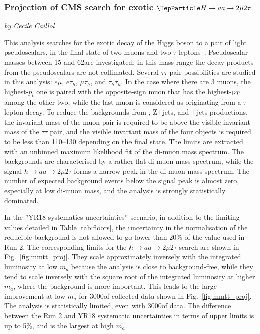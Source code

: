 \subsubsection{Projection of CMS search for exotic $\PH\to aa \to 2\mu 2\tau$}
\begin{center}
 {\it{ by Cecile Caillol}}
\end{center}


This analysis searches for the exotic decay of the Higgs boson to a pair of light pseudoscalars, in the
final state of two muons and two $\tau$ leptons~\cite{Sirunyan:2018mbx}. Pseudoscalar
masses between 15 and 62\GeV are investigated; in this mass range the decay products from the pseudoscalars are
not collimated.
Several $\tau\tau$ pair possibilities are studied in this analysis: $e\mu$, $e\tau_h$,
$\mu\tau_h$, and $\tau_h\tau_h$. In the case where there are 3 muons, the highest-$p_t$ one is paired with
the opposite-sign muon that has the highest-$\mathrm{p}_{T}$ among the other two, while the last muon is considered as
originating from a $\tau$ lepton decay.
To reduce the backgrounds from \PZ\PZ, Z+jets, and \PW\PZ+jets productions, the invariant mass of the muon pair
is required to be above the visible invariant mass of the $\tau\tau$ pair, and the
visible invariant mass of the four objects is required to be less than 110--130 \UGeV depending on the final state.
The limits are extracted with an unbinned maximum likelihood fit of the di-muon mass spectrum.
The backgrounds are characterised by a rather flat di-muon mass spectrum, while the signal $h\to aa \to 2\mu2\tau$
forms a narrow peak in the di-muon mass spectrum.
The number of expected background events below the signal peak is almost zero,
especially at low di-muon mass, and the analysis is strongly statistically dominated.

In the ''YR18 systematics uncertainties'' scenario, in addition to the limiting values detailed in Table \ref{tab:floors}, the uncertainty in the normalisation of the reducible background is not allowed to go lower than 20\% of the value used in Run-2. The corresponding limits for the $h \to aa \to 2\mu2\tau$ search are shown in Fig.~\ref{fig:mmtt_proj}.
They scale approximately inversely with the integrated luminosity at low $m_a$ because the
analysis is close to background-free, while they tend to scale inversely with the square root of the integrated luminosity at higher $m_a$, where the background is more important. This leads to the large improvement at low $m_a$ for 3000\fbinv of collected data shown in Fig.~\ref{fig:mmtt_proj}. The analysis is statistically limited, even with 3000\fbinv of data. The difference between the Run 2 and YR18 systematic uncertainties in terms of upper limits
is up to 5\%, and is the largest at high $m_a$.

